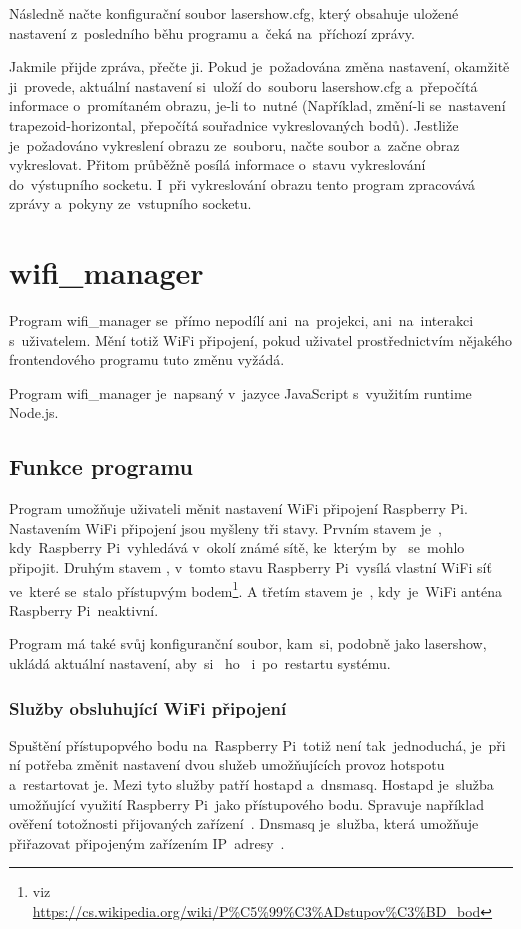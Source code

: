 Následně načte konfigurační soubor lasershow.cfg, který obsahuje uložené nastavení z~posledního běhu programu a~čeká na~příchozí zprávy.

Jakmile přijde zpráva, přečte ji. Pokud je~požadována změna nastavení, okamžitě ji~provede, aktuální nastavení si~uloží do~souboru lasershow.cfg a~přepočítá informace o~promítaném obrazu, je-li to~nutné (Například, změní-li se~nastavení trapezoid-horizontal, přepočítá souřadnice vykreslovaných bodů).
Jestliže je~požadováno vykreslení obrazu ze~souboru, načte soubor a~začne obraz vykreslovat.
Přitom průběžně posílá informace o~stavu vykreslování do~výstupního socketu.
I~při vykreslování obrazu tento program zpracovává zprávy a~pokyny ze~vstupního socketu.

\section{wifi\_manager}

Program wifi\_manager se~přímo nepodílí ani~na~projekci, ani~na~interakci s~uživatelem. Mění totiž WiFi připojení, pokud uživatel prostřednictvím nějakého frontendového programu tuto změnu vyžádá.

Program wifi\_manager je~napsaný v~jazyce JavaScript s~využitím runtime Node.js.

\subsection{Funkce programu}
Program umožňuje uživateli měnit nastavení WiFi připojení Raspberry Pi. Nastavením WiFi připojení jsou myšleny tři stavy.
Prvním stavem je~, kdy~Raspberry Pi~vyhledává v~okolí známé sítě, ke~kterým by ~se~mohlo připojit.
Druhým stavem , v~tomto stavu Raspberry Pi~vysílá vlastní WiFi síť ve~které se~stalo přístupvým bodem\footnote{viz \url{https://cs.wikipedia.org/wiki/P\%C5\%99\%C3\%ADstupov\%C3\%BD\_bod}}.
A třetím stavem je~, kdy~je~WiFi anténa Raspberry Pi~neaktivní.

Program má také svůj konfiguranční soubor, kam~si, podobně jako lasershow, ukládá aktuální nastavení, aby~si ~ho~ i~po~restartu systému.

\subsubsection{Služby obsluhující WiFi připojení}
Spuštění přístupopvého bodu na~Raspberry Pi~totiž není tak~jednoduchá, je~při ní potřeba změnit nastavení dvou služeb umožňujících provoz hotspotu a~restartovat je. Mezi tyto služby patří hostapd a~dnsmasq.
Hostapd je~služba umožňující využití Raspberry Pi~jako přístupového bodu. Spravuje například ověření totožnosti přijovaných zařízení~\cite{hostapd}. Dnsmasq je~služba, která umožňuje přiřazovat připojeným zařízením IP~adresy~\cite{dnsmasq}.

